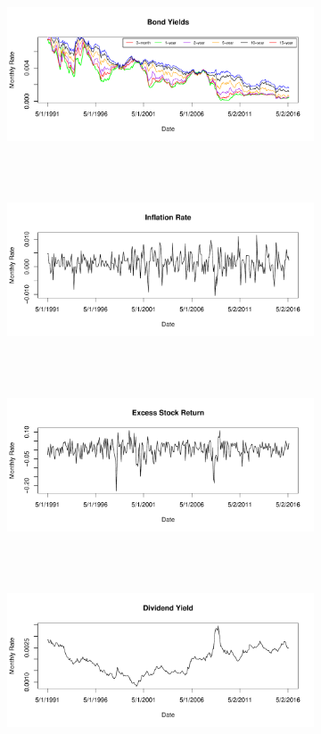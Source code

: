 \documentclass{sfuthesis}
\numberwithin{equation}{chapter}
\begin{document}
		\begin{figure}[h]
			\centering
			\begin{subfigure}[t]{0.8\textwidth}
				\centering
				\includegraphics[width=12cm, height=5.3cm]{bondyield.pdf}
			\end{subfigure}
			\begin{subfigure}[t]{0.8\textwidth}
				\centering
				\includegraphics[width=12cm, height=5.3cm]{inf.pdf}
			\end{subfigure}
			\begin{subfigure}[t]{0.8\textwidth}
				\centering
				\includegraphics[width=12cm, height=5.3cm]{exc.pdf}
			\end{subfigure}
			\begin{subfigure}[t]{0.8\textwidth}
				\centering
				\includegraphics[width=12cm, height=5.3cm]{div.pdf}

\end{subfigure}
\end{figure}
\end{document}
